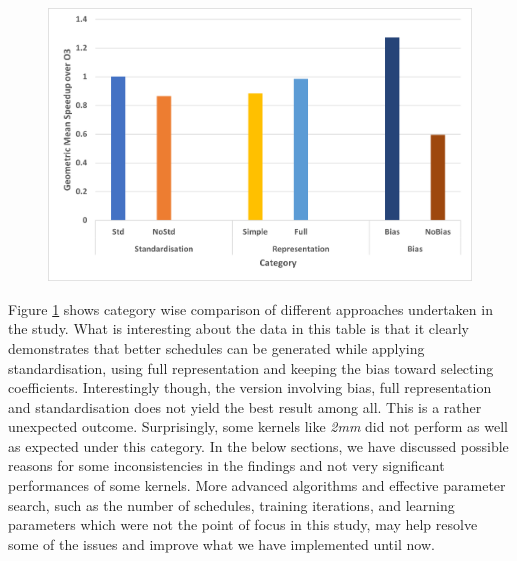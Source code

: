 \documentclass[logo,msc]{infthesis}           %
\begin{document}
\begin{figure}
\includegraphics[width=\linewidth]{Images/PolyGymRL_Strategies.png}
\label{fig:PolyGymRL_Strategies}
\end{figure}

Figure \ref{fig:PolyGymRL_Strategies} shows category wise comparison of different approaches undertaken in the study. What is interesting about the data in this table is that it clearly demonstrates that better schedules can be generated while applying standardisation, using full representation and keeping the bias toward selecting coefficients. Interestingly though, the version involving bias, full representation and standardisation does not yield the best result among all. This is a rather unexpected outcome. Surprisingly, some kernels like \textit{2mm} did not perform as well as expected under this category. In the below sections, we have discussed possible reasons for some inconsistencies in the findings and not very significant performances of some kernels. More advanced algorithms and effective parameter search, such as the number of schedules, training iterations, and learning parameters which were not the point of focus in this study, may help resolve some of the issues and improve what we have implemented until now.
\end{document}
